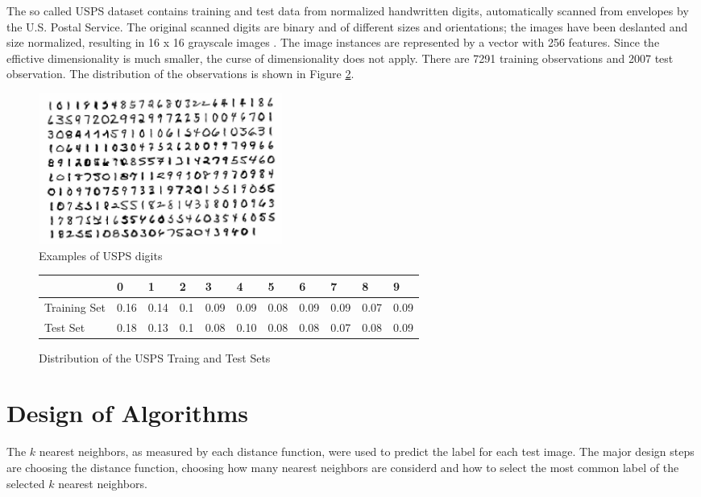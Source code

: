 \documentclass[10pt,twocolumn,letterpaper]{article}
\begin{document}
The so called USPS dataset contains training and test data from normalized handwritten digits, automatically
scanned from envelopes by the U.S. Postal Service. The original scanned digits are binary and of different sizes and orientations; the images have been deslanted and size normalized, resulting in 16 x 16 grayscale images \cite{LeCun}. The image instances are represented by a vector with 256 features. Since the effictive dimensionality is much smaller, the curse of dimensionality does not apply. There are 7291 training observations and 2007 test observation. The distribution of the observations is shown in Figure \ref{distribution}.
\begin{figure}[htbp]
  \centering

    \begin{minipage}{8 cm}
      \includegraphics[width=8cm]{digit2}
      \caption{Examples of USPS digits}
      \label{digits}
    \end{minipage}

\end{figure}
\begin{figure}[tb]
	\centering

 		\begin{tabular}{|l|l|l|l|l|l|l|l|l|l|l|}
  	\hline
  	 ~ & 0 & 1 & 2 & 3 & 4 & 5 & 6 & 7 & 8 & 9 \\ 
  	 \hline
		Training Set  & 0.16 & 0.14 & 0.1 & 0.09 & 0.09 & 0.08 & 0.09 & 0.09 & 0.07 & 0.09 \\ 
		Test Set & 0.18 & 0.13 & 0.1 & 0.08 & 0.10 & 0.08 & 0.08 & 0.07 & 0.08 & 0.09 \\
  	\hline
 		\end{tabular}
\caption{Distribution of the USPS Traing and Test Sets}
    \label{distribution}
\end{figure}

\section{Design of Algorithms}
The $k$ nearest neighbors, as measured by each distance function, were used to predict the label for each test image. The major design steps are choosing the distance function, choosing how many nearest neighbors are considerd and how to select the most common label of the selected $k$ nearest neighbors.
\end{document}
